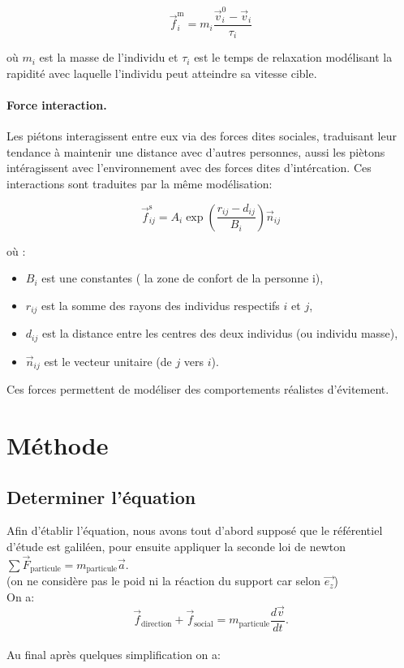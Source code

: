 \documentclass[a4paper,12pt]{article}
\begin{document}
\begin{equation}
\label{eq:force_motrice}
\vec{f}_i^{\text{m}} = m_i \frac{\vec{v}_i^0 - \vec{v}_i}{\tau_i}
\end{equation}

où $m_i$ est la masse de l'individu et $\tau_i$ est le temps de relaxation modélisant la rapidité avec laquelle l'individu peut atteindre sa vitesse cible.

\paragraph{Force interaction.}
Les piétons interagissent entre eux via des forces dites sociales, traduisant leur tendance à maintenir une distance avec d'autres personnes, aussi les piètons intéragissent avec l'environnement avec des forces dites d'intércation. Ces interactions sont traduites par la même modélisation:

\begin{equation}
\label{eq:force_sociale}
\vec{f}_{ij}^{\text{s}} = A_i \exp\left(\frac{r_{ij} - d_{ij}}{B_i}\right) \vec{n}_{ij}
\end{equation}

où :
\begin{itemize}
  \item  $B_i$ est une constantes ( la zone de confort de la personne i),
  \item $r_{ij}$ est la somme des rayons des individus respectifs $i$ et $j$,
  \item $d_{ij}$ est la distance entre les centres des deux individus (ou individu masse),
  \item $\vec{n}_{ij}$ est le vecteur unitaire (de $j$ vers $i$).
\end{itemize}

Ces forces permettent de modéliser des comportements réalistes d’évitement.


\section{Méthode}

\subsection{Determiner l'équation}

\indent Afin d’établir l’équation, nous avons tout d’abord supposé que le référentiel d’étude est galiléen, pour ensuite appliquer la seconde loi de newton $\sum \vec{F}_{\text{particule}} = m_{\text{particule}} \vec{a}$.
\\(on ne considère pas le poid ni la réaction du support car selon $\vec{e_z}$)
\\ On a:
\[
\vec{f}_{\text{direction}} + \vec{f}_{\text{social}} = m_{\text{particule}} \frac{d\vec{v}}{dt}.
\]
\\ Au final après quelques simplification on a:
\end{document}
